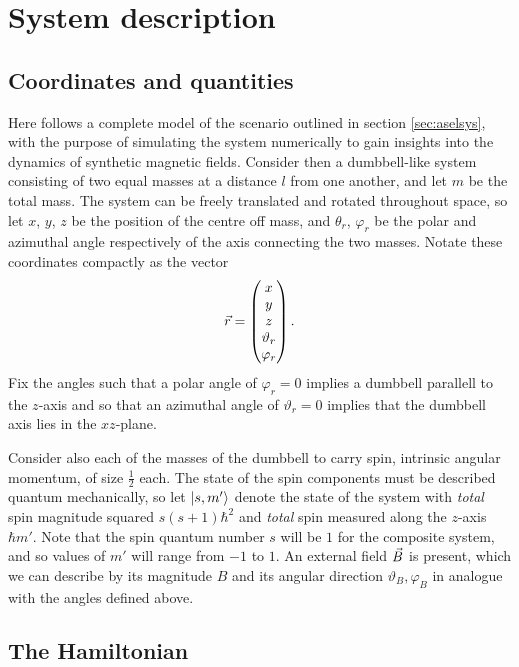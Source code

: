 \documentclass[a4paper]{article}
\begin{document}
\section{System description}
\subsection{Coordinates and quantities}
Here follows a complete model of the scenario outlined in section \ref{sec:aselsys}, with
the purpose of simulating the system numerically to gain insights into the dynamics of
synthetic magnetic fields. Consider then a dumbbell-like system consisting of two equal masses at a distance \(l\) from one
another, and let \(m\) be the total mass. The system can be freely translated and rotated
throughout space, so let \(x\), \(y\), \(z\)  be the position
of the centre off mass, and \(\theta_r\), \(\varphi_r\) be the polar and azimuthal angle
respectively of the axis connecting the two masses. Notate these coordinates compactly as the
vector \[
\vec{r}
= \begin{pmatrix} x\\ y \\ z\\ \vartheta_r \\\varphi_r\end{pmatrix}
.\] 
Fix the angles such that a polar angle of \(\varphi_r = 0\) implies a dumbbell parallell
to the \(z\)-axis and so that an azimuthal angle of \(\vartheta_r = 0\) implies that the dumbbell
axis lies in the \(xz\)-plane. 

Consider also each of the masses of the dumbbell to carry spin, intrinsic angular
momentum, of size \(\frac{1}{2}\) each. %
 The state of the spin components must be
described quantum mechanically, so let \(\ket{s, m'}\) denote the state of the system with
\textit{total} spin magnitude squared \(s(s+1)\hbar^2\) and \textit{total} spin measured
along the \(z\)-axis \(\hbar m'\). Note that the spin quantum number \(s\) will be \(1\) for
the composite system, and so values of \(m'\) will range from \(-1\) to \(1\). An external field \(\vec{B}\) is present, which
we can describe by its magnitude \(B\) and its angular direction \(\vartheta_B, \varphi_B\)
in analogue with the angles defined above.

\subsection{The Hamiltonian}\label{sec:sysham}
\end{document}
